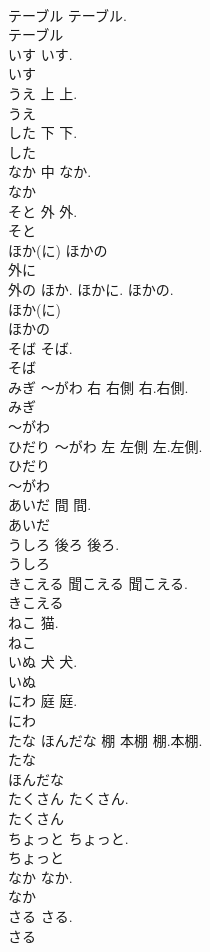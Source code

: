 \documentclass[8pt]{extreport}
\begin{document}
\begin{CJK}{UTF8}{min}
\\	テーブル		テーブル.	
\\	テーブル
\\	いす		いす.	
\\	いす
\\	うえ	上	上.	
\\	うえ
\\	した	下	下.	
\\	した
\\	なか	中	なか.	
\\	なか
\\	そと	外	外.	
\\	そと
\\	ほか(に) ほかの	
\\	外に 
\\	外の	ほか. ほかに. ほかの.	
\\	ほか(に)
\\	ほかの
\\	そば		そば.	
\\	そば
\\	みぎ ～がわ	右 右側	右.右側.	
\\	みぎ
\\	～がわ
\\	ひだり ～がわ	左 左側	左.左側.	
\\	ひだり
\\	～がわ
\\	あいだ	間	間.	
\\	あいだ
\\	うしろ	後ろ	後ろ.	
\\	うしろ
\\	きこえる	聞こえる	聞こえる.	
\\	きこえる
\\	ねこ		猫.	
\\	ねこ
\\	いぬ	犬	犬.	
\\	いぬ
\\	にわ	庭	庭.	
\\	にわ
\\	たな ほんだな	棚 本棚	棚.本棚.	
\\	たな
\\	ほんだな
\\	たくさん		たくさん.	
\\	たくさん
\\	ちょっと		ちょっと.	
\\	ちょっと
\\	なか		なか.	
\\	なか
\\	さる		さる.	
\\	さる

\end{CJK}
\end{document}
